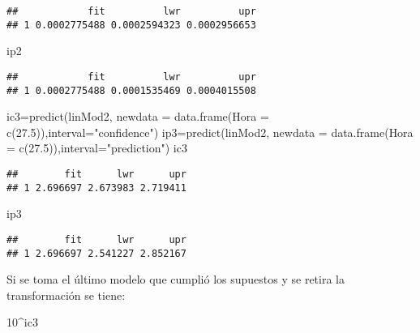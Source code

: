 \documentclass[
]{article}
\newenvironment{Shaded}{\begin{snugshade}}{\end{snugshade}}
\newcommand{\AttributeTok}[1]{\textcolor[rgb]{0.77,0.63,0.00}{#1}}
\newcommand{\DecValTok}[1]{\textcolor[rgb]{0.00,0.00,0.81}{#1}}
\newcommand{\FloatTok}[1]{\textcolor[rgb]{0.00,0.00,0.81}{#1}}
\newcommand{\FunctionTok}[1]{\textcolor[rgb]{0.00,0.00,0.00}{#1}}
\newcommand{\NormalTok}[1]{#1}
\newcommand{\OtherTok}[1]{\textcolor[rgb]{0.56,0.35,0.01}{#1}}
\newcommand{\SpecialCharTok}[1]{\textcolor[rgb]{0.00,0.00,0.00}{#1}}
\newcommand{\StringTok}[1]{\textcolor[rgb]{0.31,0.60,0.02}{#1}}
\begin{document}
\begin{verbatim}
##            fit          lwr          upr
## 1 0.0002775488 0.0002594323 0.0002956653
\end{verbatim}

\begin{Shaded}
\begin{Highlighting}[]
\NormalTok{ip2}
\end{Highlighting}
\end{Shaded}

\begin{verbatim}
##            fit          lwr          upr
## 1 0.0002775488 0.0001535469 0.0004015508
\end{verbatim}

\begin{Shaded}
\begin{Highlighting}[]
\NormalTok{ic3}\OtherTok{=}\FunctionTok{predict}\NormalTok{(linMod2, }\AttributeTok{newdata =} \FunctionTok{data.frame}\NormalTok{(}\AttributeTok{Hora =} \FunctionTok{c}\NormalTok{(}\FloatTok{27.5}\NormalTok{)),}\AttributeTok{interval=}\StringTok{"confidence"}\NormalTok{)}
\NormalTok{ip3}\OtherTok{=}\FunctionTok{predict}\NormalTok{(linMod2, }\AttributeTok{newdata =} \FunctionTok{data.frame}\NormalTok{(}\AttributeTok{Hora =} \FunctionTok{c}\NormalTok{(}\FloatTok{27.5}\NormalTok{)),}\AttributeTok{interval=}\StringTok{"prediction"}\NormalTok{)}
\NormalTok{ic3}
\end{Highlighting}
\end{Shaded}

\begin{verbatim}
##        fit      lwr      upr
## 1 2.696697 2.673983 2.719411
\end{verbatim}

\begin{Shaded}
\begin{Highlighting}[]
\NormalTok{ip3}
\end{Highlighting}
\end{Shaded}

\begin{verbatim}
##        fit      lwr      upr
## 1 2.696697 2.541227 2.852167
\end{verbatim}

Si se toma el último modelo que cumplió los supuestos y se retira la
transformación se tiene:

\begin{Shaded}
\begin{Highlighting}[]
\DecValTok{10}\SpecialCharTok{\^{}}\NormalTok{ic3}
\end{Highlighting}
\end{Shaded}
\end{document}
